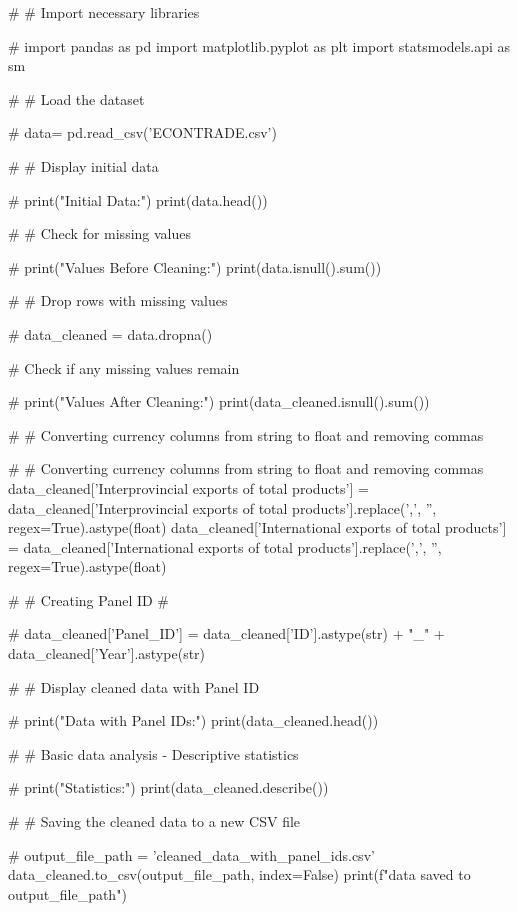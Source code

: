 # %
# Import necessary libraries

# %
import pandas as pd
import matplotlib.pyplot as plt
import statsmodels.api as sm 

# %
# Load the dataset

# %
data= pd.read_csv('ECONTRADE.csv')

# %
# Display initial data

# %
print("Initial Data:")
print(data.head())

# %
# Check for missing values

# %
print("\nMissing Values Before Cleaning:")
print(data.isnull().sum())


# %
# Drop rows with missing values

# %
data_cleaned = data.dropna()

# %
 Check if any missing values remain

# %
print("\nMissing Values After Cleaning:")
print(data_cleaned.isnull().sum())

# %
#  Converting currency columns from string to float and removing commas

# %
# Converting currency columns from string to float and removing commas
data_cleaned['Interprovincial exports of total products'] = data_cleaned['Interprovincial exports of total products'].replace(',', '', regex=True).astype(float)
data_cleaned['International exports of total products'] = data_cleaned['International exports of total products'].replace(',', '', regex=True).astype(float)


# %
# Creating Panel ID
# 

# %
data_cleaned['Panel_ID'] = data_cleaned['ID'].astype(str) + "_" + data_cleaned['Year'].astype(str)


# %
#  Display cleaned data with Panel ID

# %
print("\nCleaned Data with Panel IDs:")
print(data_cleaned.head())

# %
#  Basic data analysis - Descriptive statistics

# %
print("\nDescriptive Statistics:")
print(data_cleaned.describe())

# %
#  Saving the cleaned data to a new CSV file

# %
output_file_path = 'cleaned_data_with_panel_ids.csv'
data_cleaned.to_csv(output_file_path, index=False)
print(f"\nCleaned data saved to {output_file_path}")

